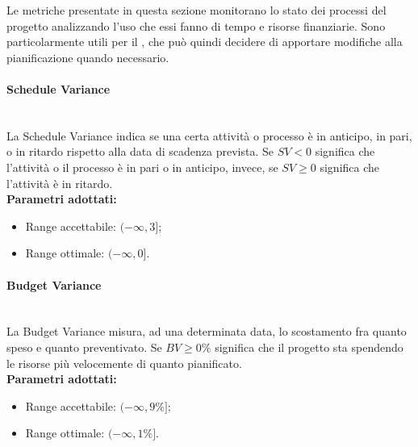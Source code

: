 Le metriche presentate in questa sezione monitorano lo stato dei processi del progetto analizzando l'uso che essi fanno di tempo e risorse finanziarie. Sono particolarmente utili per il \Res , che può quindi decidere di apportare modifiche alla pianificazione quando necessario.

\paragraph{Schedule Variance}\mbox{}\\[0,3cm]
La Schedule Variance indica se una certa attività o processo è in anticipo, in pari, o in ritardo rispetto alla data di scadenza prevista.
Se $SV < 0$ significa che l'attività o il processo è in pari o in anticipo, invece, se $SV \geq 0$ significa che l'attività è in ritardo.\\[0,2cm]
\textbf{Parametri adottati:}
\begin{itemize}
	\item Range accettabile: $(-\infty , 3]$;
	\item Range ottimale: $(-\infty , 0]$.
\end{itemize}

\paragraph{Budget Variance}\mbox{}\\[0,3cm]
La Budget Variance misura, ad una determinata data, lo scostamento fra quanto speso e quanto preventivato. Se $BV \geq 0\%$ significa che il progetto sta spendendo le risorse più velocemente di quanto pianificato.\\[0,2cm]
\textbf{Parametri adottati:}
\begin{itemize}
	\item Range accettabile: $(-\infty , 9\%]$;
	\item Range ottimale: $(-\infty , 1\%]$.
\end{itemize}